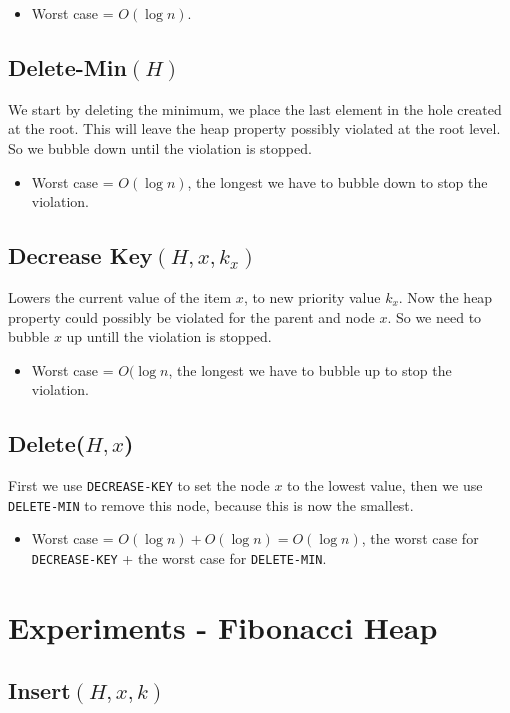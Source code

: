 \documentclass[a4paper,oneside,11pt]{article}
\begin{document}
\begin{itemize}
  \item{Worst case} = $O(\log n)$.
\end{itemize}

\subsection*{Delete-Min$(H)$}
We start by deleting the minimum, we place the last element in the hole created at the root. This will leave the heap property possibly violated at the root level. So we bubble down until the violation is stopped.

\begin{itemize}
  \item{Worst case} = $O(\log n)$, the longest we have to bubble down to stop the violation.
\end{itemize}
\subsection*{Decrease Key$(H, x, k_x)$}
Lowers the current value of the item $x$, to new priority value $k_x$. Now the heap property could possibly be violated for the parent and node $x$. So we need to bubble $x$ up untill the violation is stopped.

\begin{itemize}
  \item{Worst case} = $O(\log n$, the longest we have to bubble up to stop the violation.
\end{itemize}

\subsection*{Delete($H, x$)}
First we use \texttt{DECREASE-KEY} to set the node $x$ to the lowest value, then we use \texttt{DELETE-MIN} to remove this node, because this is now the smallest.

\begin{itemize}
  \item{Worst case} = $O(\log n) + O(\log n) = O(\log n)$, the worst case for \texttt{DECREASE-KEY} + the worst case for \texttt{DELETE-MIN}.
\end{itemize}
\section*{Experiments - Fibonacci Heap}
\subsection*{Insert$(H,x,k)$}
\end{document}
